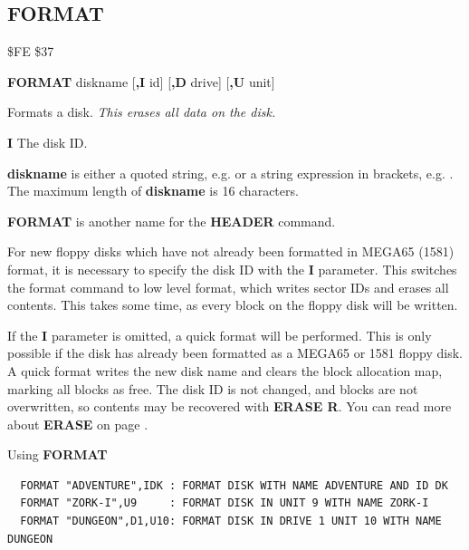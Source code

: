 \subsection{FORMAT}
\begin{description}[leftmargin=2cm,style=nextline]
\item [Token:] \$FE \$37
\item [Format:] {\bf FORMAT} diskname [{\bf,I} id] [{\bf,D} drive] [{\bf,U} unit]
\item [Usage:]
   Formats a disk. {\em This erases all data on the disk.}

   {\bf I} The disk ID.

   {\bf diskname} is either a quoted string, e.g.  or
   a string expression in brackets, e.g. .
   The maximum length of {\bf diskname} is 16 characters.

   \drivedefinition

   \unitdefinition

\item [Remarks:] {\bf FORMAT} is another name for the {\bf HEADER} command.

   For new floppy disks which have not already been formatted in MEGA65 (1581) format,
   it is necessary to specify the disk ID with the
   {\bf I} parameter. This switches the format command to low level
   format, which writes sector IDs and erases all contents.
   This takes some time, as every block on the floppy disk will be written.

   If the {\bf I} parameter is omitted, a quick format will
   be performed. This is only possible if the disk has already been formatted
   as a MEGA65 or 1581 floppy disk.
   A quick format writes the new disk name and clears the
   block allocation map, marking all blocks as free.
   The disk ID is not changed, and blocks are not overwritten,
   so contents may be recovered with {\bf ERASE R}.
   You can read more about {\bf ERASE} on page \pageref{BASIC 65 Commands!ERASE}.

\item [Examples:] Using {\bf FORMAT}
\begin{tcolorbox}[colback=black,coltext=white]
\verbatimfont{\codefont}
\begin{verbatim}
  FORMAT "ADVENTURE",IDK : FORMAT DISK WITH NAME ADVENTURE AND ID DK
  FORMAT "ZORK-I",U9     : FORMAT DISK IN UNIT 9 WITH NAME ZORK-I
  FORMAT "DUNGEON",D1,U10: FORMAT DISK IN DRIVE 1 UNIT 10 WITH NAME DUNGEON
\end{verbatim}
\end{tcolorbox}
\end{description}

